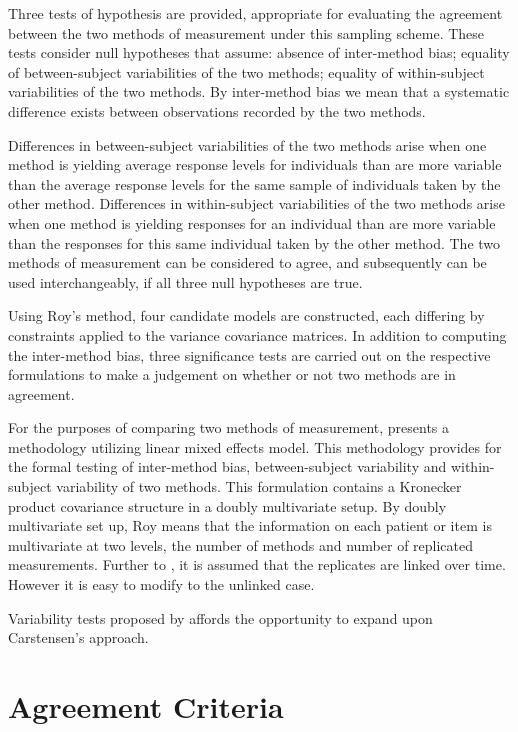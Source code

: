 \documentclass[12pt, a4paper]{article}
\theoremstyle{plain}
\theoremstyle{definition}
\theoremstyle{remark}
\begin{document}
Three tests of hypothesis are provided, appropriate for evaluating the agreement between the two methods of measurement under this sampling scheme. These tests consider null hypotheses that assume: absence of inter-method bias; equality of between-subject variabilities of the two methods; equality of within-subject variabilities of the two methods. By inter-method bias we mean that a systematic difference exists between observations recorded by the two methods. 
	
Differences in between-subject variabilities of the two methods arise when one method is yielding average response levels for individuals than are more variable than the average response levels for the same sample of individuals taken by the other method.  Differences in within-subject variabilities of the two methods arise when one method is yielding responses for an individual than are more variable than the responses for this same individual taken by the other method. The two methods of measurement can be considered to agree, and subsequently can be used interchangeably, if all three null hypotheses are true.	

\bigskip
Using Roy's method, four candidate models are constructed, each differing by constraints applied to the variance covariance matrices. In addition to computing the inter-method bias, three significance tests are carried out on the respective formulations to make a judgement on whether or not two methods are in agreement.
\bigskip

	
	For the purposes of comparing two methods of measurement, \citet{ARoy2009} presents a methodology utilizing linear mixed effects model. This methodology provides for the formal testing of inter-method bias, between-subject variability and within-subject variability of two methods. This formulation contains a Kronecker product covariance structure in a doubly multivariate setup. By doubly multivariate set up, Roy means that the information on each patient or item is multivariate at two levels, the number of methods and number of replicated measurements. Further to \citet{lam}, it is assumed that the replicates are linked over time. However it is easy to modify to the unlinked case.
	

	\bigskip
		Variability tests proposed by \citet{ARoy2009} affords the opportunity to expand upon Carstensen's approach.

	\section{Agreement Criteria}
	
\end{document}
